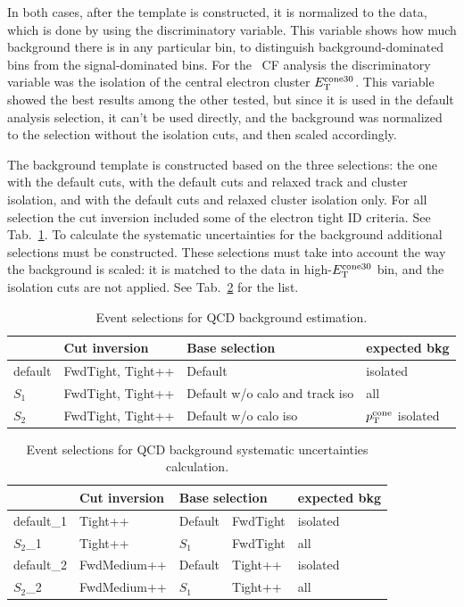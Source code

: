 In both cases, after the template is constructed, it is normalized to the data, which is done by using the discriminatory variable. This variable shows how much background there is in any particular bin, to distinguish background-dominated bins from the signal-dominated bins. For the \Zee\ CF analysis the discriminatory variable was the isolation of the central electron cluster $E_{\mathrm{T}}^{\mathrm{cone30}}$. This variable showed the best results among the other tested, but since it is used in the default analysis selection, it can't be used directly, and the background was normalized to the selection without the isolation cuts, and then scaled accordingly.

The background template is constructed based on the three selections: the one with the default cuts, with the default cuts and relaxed track and cluster isolation, and with the default cuts and relaxed cluster isolation only. For all selection the cut inversion included some of the electron tight ID criteria. See Tab.~\ref{tab:bkg_qcd_samples}. To calculate the systematic uncertainties for the background additional selections must be constructed. These selections must take into account the way the background is scaled: it is matched to the data in high-$E_{\mathrm{T}}^{\mathrm{cone30}}$ bin, and the isolation cuts are not applied. See Tab.~\ref{tab:bkg_qcd_unc_samples} for the list.

\begin{table}
\centering
\begin{tabular}{ llll } \hline \hline
    & Cut inversion  &   Base selection    & expected bkg  \\ \hline
default & FwdTight, Tight++ & Default  & isolated \\
$S_1$   & FwdTight, Tight++ & Default w/o calo and track iso & all \\
$S_2$   & FwdTight, Tight++ & Default w/o calo iso       & $p_{\mathrm{T}}^{\mathrm{cone}}$ isolated\\
\hline \hline
\end{tabular}
\caption{Event selections for QCD background estimation.}
\label{tab:bkg_qcd_samples}
\end{table}
\begin{table}
\centering
\begin{tabular}{ lll@{ w/o }ll } \hline \hline
    & Cut inversion  &  \multicolumn{2}{l}{Base selection}    & expected bkg \\ \hline
default\_1 & Tight++     & Default & FwdTight  & isolated \\
$S_2$\_1     & Tight++     & $S_1$ & FwdTight      & all \\
default\_2 & FwdMedium++ & Default & Tight++   & isolated \\
$S_2$\_2     & FwdMedium++ & $S_1$ & Tight++       & all \\
\hline \hline
\end{tabular}
\caption{Event selections for QCD background systematic uncertainties calculation.}
\label{tab:bkg_qcd_unc_samples}
\end{table}

